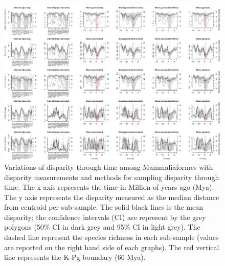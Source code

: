 \begin{landscape}
\begin{figure}[!htbp]
\centering
    \includegraphics[width=\textwidth,height=\textheight,keepaspectratio]{Supplementaries/Figures/STD/Mammaliaformes_all_methods.pdf}
\caption[Comparison of all the disparity metrics and all the time series methods for Mammaliaformes]{Variations of disparity through time among Mammaliaformes with disparity measurements and methods for sampling disparity through time. The x axis represents the time in Million of years ago (Mya). The y axis represents the disparity measured as the median distance from centroid per sub-sample. The solid black lines is the mean disparity; the confidence intervals (CI) are represent by the grey polygons (50\% CI in dark grey and 95\% CI in light grey). The dashed line represent the species richness in each sub-sample (values are reported on the right hand side of each graphs). The red vertical line represents the K-Pg boundary (66 Mya).}
\label{Supp_disparity_all_Mammaliaformes}
\end{figure}
\end{landscape}

